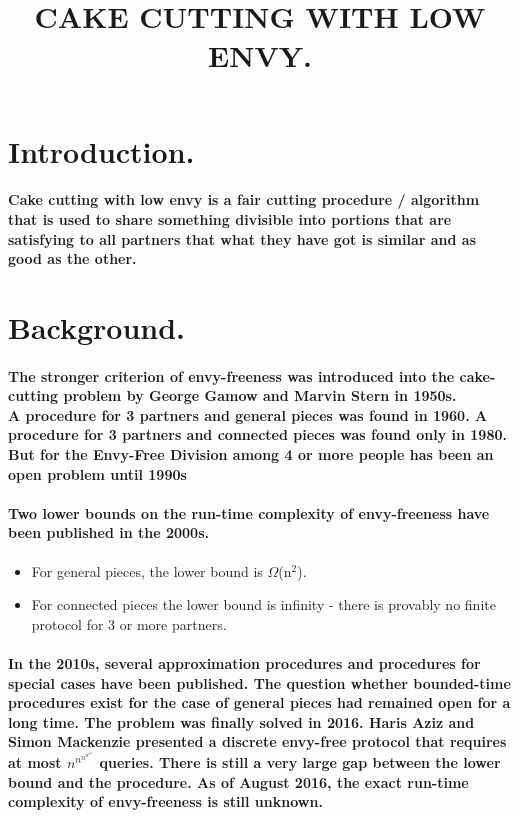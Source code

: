\documentclass[12pt]{report}
\title{\textbf{CAKE CUTTING WITH LOW ENVY.}}
\author{}
\begin{document}
\maketitle

	\section{Introduction.} 
	\paragraph{Cake cutting with low envy is a fair cutting procedure / algorithm that is used to share something divisible into portions that are satisfying to all partners that what they have got is similar and as good as the other. }
		\section{Background.}
		\paragraph{The stronger criterion of envy-freeness was introduced into the cake-cutting problem by George Gamow and Marvin Stern in 1950s.\\
			A procedure for 3 partners and general pieces was found in 1960. A procedure for 3 partners and connected pieces was found only in 1980.\\
			But for the Envy-Free Division among 4 or more people has been an open problem until 1990s}
		\paragraph{Two lower bounds on the run-time complexity of envy-freeness have been published in the 2000s.}
		\begin{itemize}
			\item For general pieces, the lower bound is $\Omega$(n$^{2}$).
			\item For connected pieces the lower bound is infinity - there is provably no finite protocol for 3 or more partners.
		\end{itemize}
		\paragraph{In the 2010s, several approximation procedures and procedures for special cases have been published. The question whether bounded-time procedures exist for the case of general pieces had remained open for a long time. The problem was finally solved in 2016. Haris Aziz and Simon Mackenzie presented a discrete envy-free protocol that requires \\
			at most ${\displaystyle n^{n^{n^{n^{n^{n}}}}}}$ queries. There is still a very large gap between the lower bound and the procedure. As of August 2016, the exact run-time complexity of envy-freeness is still unknown. }
\end{document}
